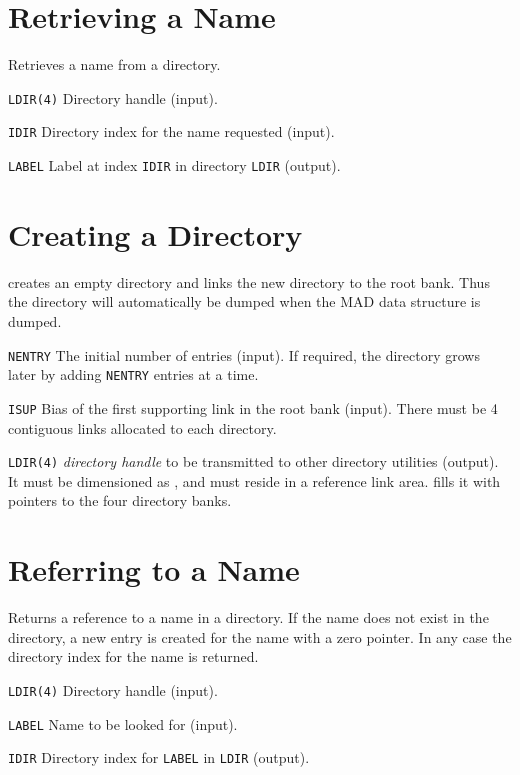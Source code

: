 \section{Retrieving a Name}
\label{DINAME}
Retrieves a name from a directory.
\begin{mylist}
\item[\tt LDIR(4)]
Directory handle (input).
\item[\tt IDIR]
Directory index for the name requested (input).
\item[\tt LABEL]
Label at index {\tt IDIR} in directory {\tt LDIR} (output).
\end{mylist}

\section{Creating a Directory}
\label{DIMAKE}
creates an empty directory and links the new directory to the root bank.
Thus the directory will automatically be dumped when the MAD data
structure is dumped.
\begin{mylist}
\item[\tt NENTRY]
The initial number of entries (input).
If required, the directory grows later by adding {\tt NENTRY} entries
at a time.
\item[\tt ISUP]
Bias of the first supporting link in the root bank (input).
There must be 4 contiguous links allocated to each directory.
\item[\tt LDIR(4)]
{\em directory handle} to be transmitted
to other directory utilities (output).
It must be dimensioned as ,
and must reside in a reference link area.
 fills it with pointers to the four directory banks.
\end{mylist}
 
\section{Referring to a Name}
\label{DIREFE}
Returns a reference to a name in a directory.
If the name does not exist in the directory,
a new entry is created for the name with a zero pointer.
In any case the directory index for the name is returned.
\begin{mylist}
\item[\tt LDIR(4)]
Directory handle (input).
\item[\tt LABEL]
Name to be looked for (input).
\item[\tt IDIR]
Directory index for {\tt LABEL} in {\tt LDIR} (output).
\end{mylist}

